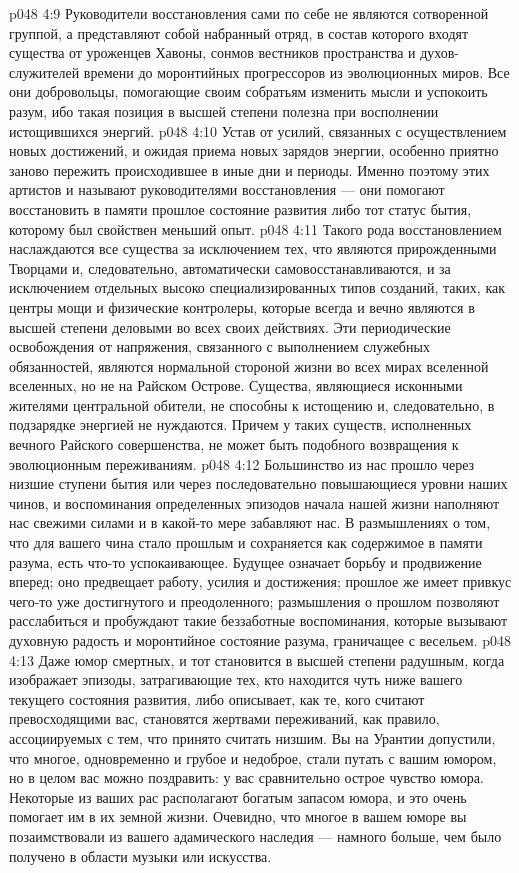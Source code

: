 \vs p048 4:9 Руководители восстановления сами по себе не являются сотворенной группой, а представляют собой набранный отряд, в состав которого входят существа от уроженцев Хавоны, сонмов вестников пространства и духов\hyp{}служителей времени до моронтийных прогрессоров из эволюционных миров. Все они добровольцы, помогающие своим собратьям изменить мысли и успокоить разум, ибо такая позиция в высшей степени полезна при восполнении истощившихся энергий.
\vs p048 4:10 \pc Устав от усилий, связанных с осуществлением новых достижений, и ожидая приема новых зарядов энергии, особенно приятно заново пережить происходившее в иные дни и периоды.  Именно поэтому этих артистов и называют руководителями восстановления --- они помогают восстановить в памяти прошлое состояние развития либо тот статус бытия, которому был свойствен меньший опыт.
\vs p048 4:11 Такого рода восстановлением наслаждаются все существа за исключением тех, что являются прирожденными Творцами и, следовательно, автоматически самовосстанавливаются, и за исключением отдельных высоко специализированных типов созданий, таких, как центры мощи и физические контролеры, которые всегда и вечно являются в высшей степени деловыми во всех своих действиях. Эти периодические освобождения от напряжения, связанного с выполнением служебных обязанностей, являются нормальной стороной жизни во всех мирах вселенной вселенных, но не на Райском Острове. Существа, являющиеся исконными жителями центральной обители, не способны к истощению и, следовательно, в подзарядке энергией не нуждаются. Причем у таких существ, исполненных вечного Райского совершенства, не может быть подобного возвращения к эволюционным переживаниям.
\vs p048 4:12 Большинство из нас прошло через низшие ступени бытия или через последовательно повышающиеся уровни наших чинов, и воспоминания определенных эпизодов начала нашей жизни наполняют нас свежими силами и в какой\hyp{}то мере забавляют нас. В размышлениях о том, что для вашего чина стало прошлым и сохраняется как содержимое в памяти разума, есть что\hyp{}то успокаивающее. Будущее означает борьбу и продвижение вперед; оно предвещает работу, усилия и достижения; прошлое же имеет привкус чего\hyp{}то уже достигнутого и преодоленного; размышления о прошлом позволяют расслабиться и пробуждают такие беззаботные воспоминания, которые вызывают духовную радость и моронтийное состояние разума, граничащее с весельем.
\vs p048 4:13 Даже юмор смертных, и тот становится в высшей степени радушным, когда изображает эпизоды, затрагивающие тех, кто находится чуть ниже вашего текущего состояния развития, либо описывает, как те, кого считают превосходящими вас, становятся жертвами переживаний, как правило, ассоциируемых с тем, что принято считать низшим. Вы на Урантии допустили, что многое, одновременно и грубое и недоброе, стали путать с вашим юмором, но в целом вас можно поздравить: у вас сравнительно острое чувство юмора. Некоторые из ваших рас располагают богатым запасом юмора, и это очень помогает им в их земной жизни. Очевидно, что многое в вашем юморе вы позаимствовали из вашего адамического наследия --- намного больше, чем было получено в области музыки или искусства.
